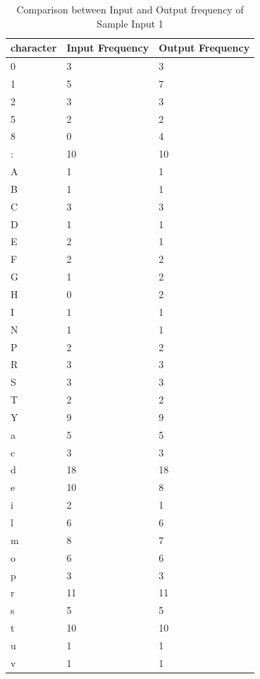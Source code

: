 \begin{table}[H]
\centering
\begin{tabular}{|p{2cm}|p{2cm}|p{2cm}|}
\hline
character & Input Frequency & Output Frequency \\
\hline
0 & 3  & 3 \\
\hline
1 & 5  & 7 \\
\hline
2 & 3  & 3 \\
\hline
5 & 2  & 2 \\
\hline
8 & 0  & 4 \\
\hline
: & 10 & 10 \\
\hline
A & 1  & 1 \\
\hline
B & 1  & 1 \\
\hline
C & 3  & 3 \\
\hline
D & 1  & 1 \\
\hline
E & 2  & 1 \\
\hline
F & 2  & 2 \\
\hline
G & 1  & 2 \\
\hline
H & 0  & 2 \\
\hline
I & 1  & 1 \\
\hline
N & 1  & 1 \\
\hline
P & 2  & 2 \\
\hline
R & 3  & 3 \\
\hline
S & 3  & 3 \\
\hline
T & 2  & 2 \\
\hline
Y & 9  & 9 \\
\hline
a & 5  & 5 \\
\hline
c & 3  & 3 \\
\hline
d & 18 & 18 \\
\hline
e & 10 & 8 \\
\hline
i & 2  & 1 \\
\hline
l & 6  & 6 \\
\hline
m & 8  & 7 \\
\hline
o & 6  & 6 \\
\hline
p & 3  & 3 \\
\hline
r & 11 & 11 \\
\hline
s & 5  & 5 \\
\hline
t & 10 & 10 \\
\hline
u & 1  & 1 \\
\hline
v & 1  & 1 \\
\hline
\end{tabular}
\caption { Comparison between Input and Output frequency of Sample Input 1}
\label {tab:Table1}
\end{table}

